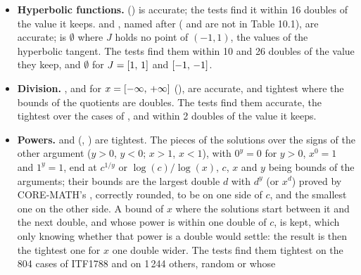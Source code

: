 \documentclass[12pt,a4paper,twoside,openright]{book}
\begin{document}
\begin{itemize}
   and  (, ,
  ) are accurate, or one double beyond: the pieces of the
  preimage are $k\pi$, enclosed within about one double from $\pi$ in
  double-double, plus or minus the inverse function of $J$, which is added
  before the sum is rounded; beyond $2^{52}$ a bound of $x$ is kept, and an
  $x$ of a single double is decided by the image of the function. The tests
  find them accurate but for one double, with the bounds of $x$ beyond
  $2^{52}$, and within 6 doubles (4, 5 and 3 found) of the value they keep
  from $1$ to $2^{50}$, away from the points where the inverse function
  magnifies the width of the image.
\item[$\bullet$] \textbf{Hyperbolic functions.} 
  () is accurate; the tests find it within 16 doubles of the
  value it keeps.  and , named after
   ( and  are not in Table 10.1),
  are accurate;  is $\emptyset$ where $J$ holds no
  point of $(-1, 1)$, the values of the hyperbolic tangent.\newinvfive{}
  The tests find them within 10 and 26 doubles of the value they keep, and
  $\emptyset$ for $J=[1,\,1]$ and $[-1,\,-1]$.
\item[$\bullet$] \textbf{Division.} , and
   for $x=[-\infty,\,+\infty]$ (), are
  accurate, and tightest where the bounds of the quotients are doubles. The
  tests find them accurate, the tightest over the cases of \code{\%}, and
   within 2 doubles of the value it keeps.
\item[$\bullet$] \textbf{Powers.}\newinvfive{}  and
   (, ) are
  tightest. The pieces of the solutions over the signs of the other
  argument ($y>0$, $y<0$; $x>1$, $x<1$), with $0^y=0$ for $y>0$, $x^0=1$
  and $1^y=1$, end at $c^{1/y}$ or $\log(c)/\log(x)$, $c$, $x$ and $y$
  being bounds of the arguments; their bounds are the largest double $d$
  with $d^y$ (or $x^d$) proved by CORE-MATH's , correctly
  rounded, to be on one side of $c$, and the smallest one on the other
  side. A bound of $x$ where the solutions start between it and the next
  double, and whose power is within one double of $c$, is kept, which only
  knowing whether that power is a double would settle: the result is then
  the tightest one for $x$ one double wider. The tests find them tightest
  on the 804 cases of ITF1788 and on 1\,244 others, random or whose

\end{itemize}
\end{document}
